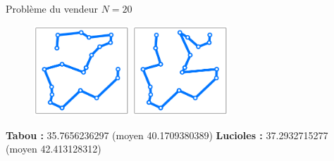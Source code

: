\documentclass{beamer}
\begin{document}
\begin{frame}{Problème du vendeur}
$N=20$
\begin{figure}[h!]
  \centering
  \includegraphics[width=0.32\textwidth]{figures/salesman_tabu_n20.pdf}
    \includegraphics[width=0.32\textwidth]{figures/salesman_firefly_n20.pdf}
\end{figure}
\textbf{Tabou :} 35.7656236297 (moyen 40.1709380389)
\textbf{Lucioles :} 37.2932715277 (moyen 42.413128312)
\end{frame}
\end{document}

